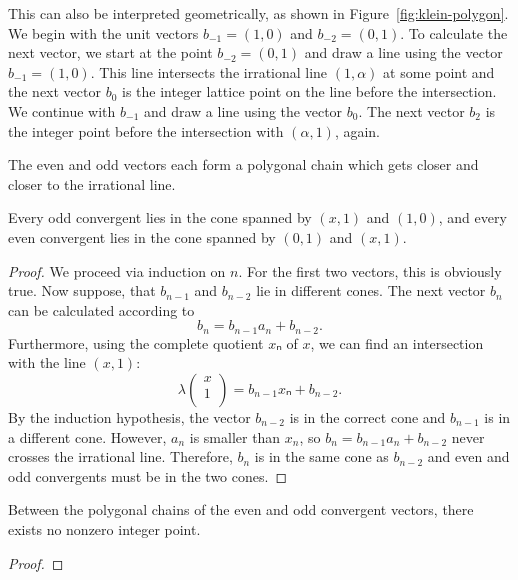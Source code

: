 This can also be interpreted geometrically, as shown in Figure~\ref{fig:klein-polygon}.
We begin with the unit vectors $b_{-1} = (1, 0)$ and $b_{-2} = (0, 1)$.
To calculate the next vector, we start at the point $b_{-2} = (0, 1)$ and draw a line using the vector $b_{-1} = (1, 0)$.
This line intersects the irrational line $(1, α)$ at some point
and the next vector $b_0$ is the integer lattice point on the line before the
intersection.
We continue with $b_{-1}$ and draw a line using the vector $b_0$.
The next vector $b_2$ is the integer point before the intersection with $(α, 1)$, again.

The even and odd vectors each form a polygonal chain which gets closer and
closer to the irrational line.

\begin{lemma}
  \label{lem:klein-conv}
  Every odd convergent lies in the cone spanned by $(x, 1)$ and $(1, 0)$,
  and every even convergent lies in the cone spanned by $(0, 1)$ and $(x, 1)$.
\end{lemma}

\begin{proof}
  We proceed via induction on $n$.
  For the first two vectors, this is obviously true.
  Now suppose, that $b_{n-1}$ and $b_{n-2}$ lie in different cones.
  The next vector $b_n$ can be calculated according to
  \[
    b_n = b_{n-1} a_n + b_{n-2}.
  \]
  Furthermore, using the complete quotient $xₙ$ of $x$, we can find an intersection with the line $(x, 1)$:
  \[
    λ
    \begin{pmatrix}
      x \\
      1 \\
    \end{pmatrix}
    = b_{n-1} xₙ + b_{n-2}.
  \]
  By the induction hypothesis, the vector $b_{n-2}$ is in the correct cone
  and $b_{n-1}$ is in a different cone.
  However, $a_n$ is smaller than $x_n$, so $b_n = b_{n-1} a_n + b_{n-2}$ never crosses the irrational line.
  Therefore, $b_n$ is in the same cone as $b_{n-2}$ and even and odd
  convergents must be in the two cones.
\end{proof}

\begin{lemma}
  \label{lem:klein-empty}
  Between the polygonal chains of the even and odd convergent vectors,
  there exists no nonzero integer point.
\end{lemma}

\begin{proof}

\end{proof}

